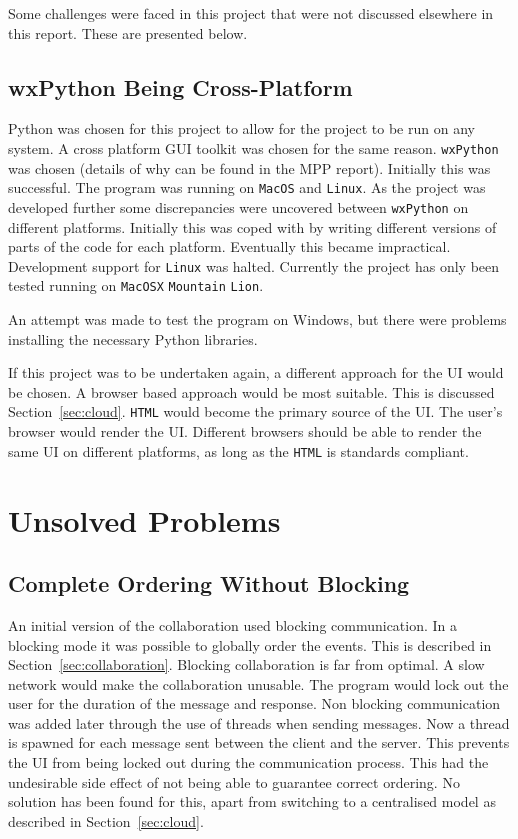 Some challenges were faced in this project that were not discussed elsewhere in this report.  These are presented below.

\subsection{wxPython Being Cross-Platform}
Python was chosen for this project to allow for the project to be run on any system.  A cross platform \ac{GUI} toolkit was chosen for the same reason.  \texttt{wxPython} was chosen (details of why can be found in the MPP report).  Initially this was successful.  The program was running on \texttt{MacOS} and \texttt{Linux}.  As the project was developed further some discrepancies were uncovered between \texttt{wxPython} on different platforms.  Initially this was coped with by writing different versions of parts of the code for each platform.  Eventually this became impractical.  Development support for \texttt{Linux} was halted.  Currently the project has only been tested running on \texttt{MacOSX} \texttt{Mountain} \texttt{Lion}.

An attempt was made to test the program on Windows, but there were problems installing the necessary Python libraries.

If this project was to be undertaken again, a different approach for the \ac{UI} would be chosen.  A browser based approach would be most suitable.  This is discussed Section~\ref{sec:cloud}.  \texttt{HTML} would become the primary source of the \ac{UI}.  The user's browser would render the \ac{UI}.  Different browsers should be able to render the same \ac{UI} on different platforms, as long as the \texttt{HTML} is standards compliant.

\section{Unsolved Problems}

\subsection{Complete Ordering Without Blocking}
\label{sec:ordering}

An initial version of the collaboration used blocking communication.  In a blocking mode it was possible to globally order the events.  This is described in Section~\ref{sec:collaboration}.  Blocking collaboration is far from optimal.  A slow network would make the collaboration unusable.  The program would lock out the user for the duration of the message and response.  Non blocking communication was added later through the use of threads when sending messages.  Now a thread is spawned for each message sent between the client and the server.  This prevents the \ac{UI} from being locked out during the communication process.  This had the undesirable side effect of not being able to guarantee correct ordering.  No solution has been found for this, apart from switching to a centralised model as described in Section~\ref{sec:cloud}.

